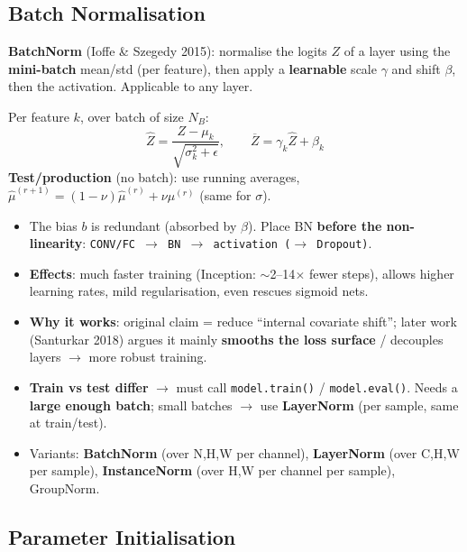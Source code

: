 \documentclass[10pt,a4paper]{article}
\begin{document}
	\subsection{Batch Normalisation}

	\begin{definitionbox}
		\textbf{BatchNorm} (Ioffe \& Szegedy 2015): normalise the logits $Z$ of a layer using the \textbf{mini-batch} mean/std (per feature), then apply a \textbf{learnable} scale $\gamma$ and shift $\beta$, then the activation. Applicable to any layer.
	\end{definitionbox}

	\begin{formulabox}
		Per feature $k$, over batch of size $N_B$:
		\[
		\hat Z = \frac{Z-\mu_k}{\sqrt{\sigma_k^2+\epsilon}}, \qquad \overline Z = \gamma_k \hat Z + \beta_k
		\]
		\textbf{Test/production} (no batch): use running averages, $\hat\mu^{(r+1)}=(1-\nu)\hat\mu^{(r)}+\nu\mu^{(r)}$ (same for $\sigma$).
	\end{formulabox}
	\begin{itemize}[leftmargin=*]
		\item The bias $b$ is redundant (absorbed by $\beta$). Place BN \textbf{before the non-linearity}: \texttt{CONV/FC $\to$ BN $\to$ activation ($\to$ Dropout)}.
		\item \textbf{Effects}: much faster training (Inception: $\sim$2--14$\times$ fewer steps), allows higher learning rates, mild regularisation, even rescues sigmoid nets.
		\item \textbf{Why it works}: original claim = reduce ``internal covariate shift''; later work (Santurkar 2018) argues it mainly \textbf{smooths the loss surface} / decouples layers $\rightarrow$ more robust training.
		\item \textbf{Train vs test differ} $\rightarrow$ must call \texttt{model.train()} / \texttt{model.eval()}. Needs a \textbf{large enough batch}; small batches $\rightarrow$ use \textbf{LayerNorm} (per sample, same at train/test).
		\item Variants: \textbf{BatchNorm} (over N,H,W per channel), \textbf{LayerNorm} (over C,H,W per sample), \textbf{InstanceNorm} (over H,W per channel per sample), GroupNorm.
	\end{itemize}

	\subsection{Parameter Initialisation}
\end{document}
